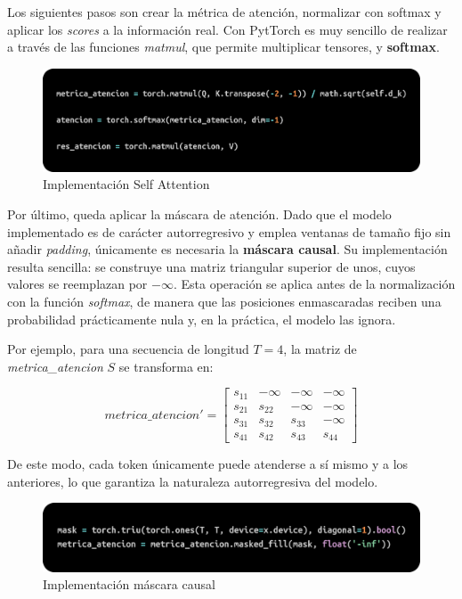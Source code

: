 \documentclass[11pt]{book}
\begin{document}
Los siguientes pasos son crear la métrica de atención, normalizar con softmax y aplicar los \textit{scores} a la información real. Con PytTorch es muy sencillo de realizar a través de las funciones \textit{matmul}, que permite multiplicar tensores, y \textbf{softmax}. 

\begin{figure}[h]
    \centering
    \includegraphics[width=0.5\linewidth]{img/atencion.png}
    \caption{Implementación Self Attention}
    \label{fig:placeholder9}
\end{figure}

Por último, queda aplicar la máscara de atención. Dado que el modelo implementado es de carácter autorregresivo y emplea ventanas de tamaño fijo sin añadir \textit{padding}, únicamente es necesaria la \textbf{máscara causal}. Su implementación resulta sencilla: se construye una matriz triangular superior de unos, cuyos valores se reemplazan por $-\infty$. Esta operación se aplica antes de la normalización con la función \textit{softmax}, de manera que las posiciones enmascaradas reciben una probabilidad prácticamente nula y, en la práctica, el modelo las ignora.  

Por ejemplo, para una secuencia de longitud $T=4$, la matriz de \textit{metrica\_atencion} $S$ se transforma en:  

\[
metrica\_atencion' =
\begin{bmatrix}
s_{11} & -\infty & -\infty & -\infty \\
s_{21} & s_{22} & -\infty & -\infty \\
s_{31} & s_{32} & s_{33} & -\infty \\
s_{41} & s_{42} & s_{43} & s_{44}
\end{bmatrix}
\]

De este modo, cada token únicamente puede atenderse a sí mismo y a los anteriores, lo que garantiza la naturaleza autorregresiva del modelo.

\begin{figure}[h]
    \centering
    \includegraphics[width=0.5\linewidth]{img/masked.png}
    \caption{Implementación máscara causal}
    \label{fig:placeholder10}
\end{figure}
\end{document}

